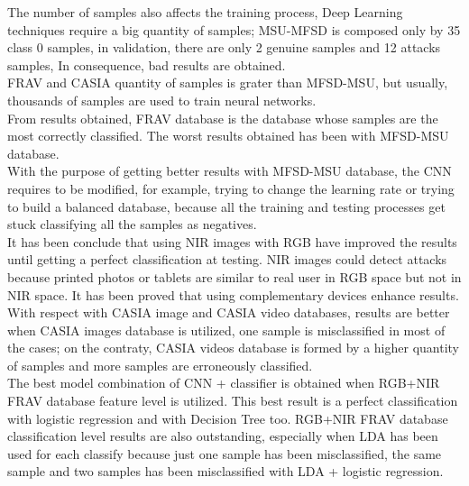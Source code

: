 The number of samples also affects the training process, Deep Learning techniques require a big quantity of samples; MSU-MFSD is composed only by 35 class 0 samples, in validation, there are only 2 genuine samples and 12 attacks samples, In consequence, bad results are obtained.\\

FRAV and CASIA quantity of samples is grater than MFSD-MSU, but usually, thousands of samples are used to train neural networks.\\ 
 
From results obtained, FRAV database is the database whose samples are the most correctly classified. The worst results obtained has been with MFSD-MSU database.\\

With the purpose of getting better results with MFSD-MSU database, the CNN requires to be modified, for example, trying to change the learning rate or trying to build a balanced database, because all the training and testing processes get stuck classifying all the samples as negatives.\\

It has been conclude that using NIR images with RGB have improved the results until getting a perfect classification at testing. NIR images could detect attacks because printed photos or tablets are similar to real user in RGB space but not in NIR space. It has been proved that using complementary devices enhance results.\\

With respect with CASIA image and CASIA video databases, results are  better when CASIA images database is utilized, one sample is misclassified in most of the cases; on the contraty, CASIA videos database is formed by a higher quantity of samples and more samples are erroneously classified.\\

The best model combination of CNN + classifier is obtained when RGB+NIR FRAV database feature level is utilized. This best result is a perfect classification with logistic regression and with Decision Tree too. RGB+NIR FRAV database classification level results are also outstanding, especially when LDA has been used for each classify because just one sample has been misclassified, the same sample and two samples has been misclassified with LDA + logistic regression.\\

